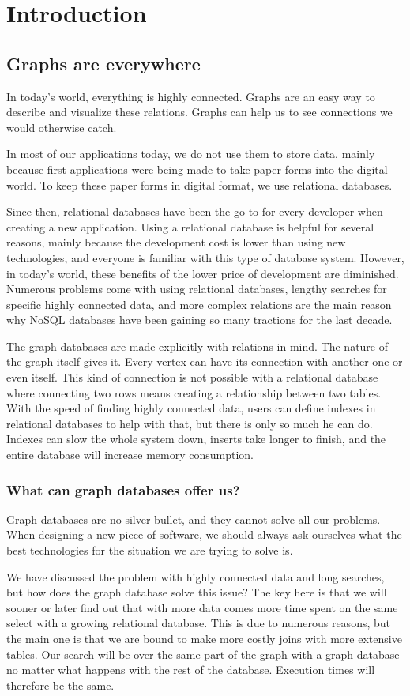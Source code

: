 \chapter{Introduction}

\section{Graphs are everywhere}

In today's world, everything is highly connected. Graphs are an easy way to describe and visualize these relations. Graphs can help us to see connections we would otherwise catch.

In most of our applications today, we do not use them to store data, mainly because first applications were being made to take paper forms into the digital world. To keep these paper forms in digital format, we use relational databases.

Since then, relational databases have been the go-to for every developer when creating a new application. Using a relational database is helpful for several reasons, mainly because the development cost is lower than using new technologies, and everyone is familiar with this type of database system. However, in today's world, these benefits of the lower price of development are diminished. Numerous problems come with using relational databases, lengthy searches for specific highly connected data, and more complex relations are the main reason why NoSQL databases have been gaining so many tractions for the last decade.

The graph databases are made explicitly with relations in mind. The nature of the graph itself gives it. Every vertex can have its connection with another one or even itself. This kind of connection is not possible with a relational database where connecting two rows means creating a relationship between two tables. With the speed of finding highly connected data, users can define indexes in relational databases to help with that, but there is only so much he can do. Indexes can slow the whole system down, inserts take longer to finish, and the entire database will increase memory consumption.

\subsection{What can graph databases offer us?}
Graph databases are no silver bullet, and they cannot solve all our problems. When designing a new piece of software, we should always ask ourselves what the best technologies for the situation we are trying to solve is.

We have discussed the problem with highly connected data and long searches, but how does the graph database solve this issue? The key here is that we will sooner or later find out that with more data comes more time spent on the same select with a growing relational database. This is due to numerous reasons, but the main one is that we are bound to make more costly joins with more extensive tables. Our search will be over the same part of the graph with a graph database no matter what happens with the rest of the database. Execution times will therefore be the same.

